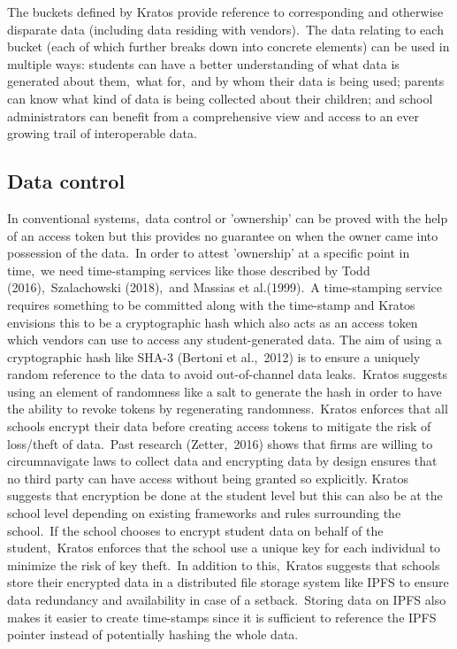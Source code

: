 \documentclass{article}
\begin{document}
\bigbreak
The buckets defined by Kratos provide reference to corresponding and otherwise disparate data (including data residing with vendors).\ The data relating to each bucket (each of which further breaks down into concrete elements) can be used in multiple ways: students can have a better understanding of what data is generated about them,\ what for,\ and by whom their data is being used; parents can know what kind of data is being collected about their children; and school administrators can benefit from a comprehensive view and access to an ever growing trail of interoperable data.\ 

\subsection{Data control}
In conventional systems,\ data control or 'ownership' can be proved with the help of an access token but this provides no guarantee on when the owner came into possession of the data.\ In order to attest 'ownership' at a specific point in time,\ we need time-stamping services like those described by Todd (2016),\ Szalachowski (2018),\ and Massias et al.(1999).\ A time-stamping service requires something to be committed along with the time-stamp and Kratos envisions this to be a cryptographic hash which also acts as an access token which vendors can use to access any student-generated data.
\bigbreak
The aim of using a cryptographic hash like SHA-3 (Bertoni et al.,\ 2012) is to ensure a uniquely random reference to the data to avoid out-of-channel data leaks.\ Kratos suggests using an element of randomness like a salt to generate the hash in order to have the ability to revoke tokens by regenerating randomness.\ Kratos enforces that all schools encrypt their data before creating access tokens to mitigate the risk of loss/theft of data.\ Past research (Zetter,\ 2016) shows that firms are willing to circumnavigate laws to collect data and encrypting data by design ensures that no third party can have access without being granted so explicitly.
\bigbreak
Kratos suggests that encryption be done at the student level but this can also be at the school level depending on existing frameworks and rules surrounding the school.\ If the school chooses to encrypt student data on behalf of the student,\ Kratos enforces that the school use a unique key for each individual to minimize the risk of key theft.\ In addition to this,\ Kratos suggests that schools store their encrypted data in a distributed file storage system like IPFS to ensure data redundancy and availability in case of a setback.\ Storing data on IPFS also makes it easier to create time-stamps since it is sufficient to reference the IPFS pointer instead of potentially hashing the whole data.
\end{document}

